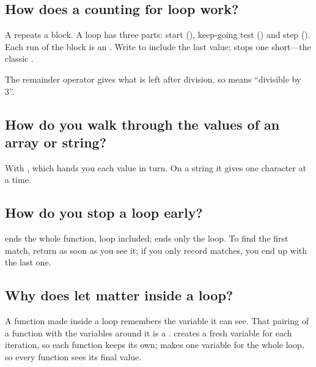 \label{ch:c03}

\subsection{How does a counting for loop work?}%
A  repeats a block. A  loop has three parts: start (), keep-going test () and step (). Each run of the block is an . Write \code{<=} to include the last value; \code{<} stops one short---the classic .

The remainder operator \code{\%} gives what is left after division, so  means ``divisible by 3''.

\subsection{How do you walk through the values of an array or string?}%
With , which hands you each value in turn. On a string it gives one character at a time.

\subsection{How do you stop a loop early?}%
 ends the whole function, loop included;  ends only the loop. To find the first match, return as soon as you see it; if you only record matches, you end up with the last one.

\subsection{Why does let matter inside a loop?}%
A function made inside a loop remembers the variable it can see. That pairing of a function with the variables around it is a .  creates a fresh variable for each iteration, so each function keeps its own;  makes one variable for the whole loop, so every function sees its final value.

